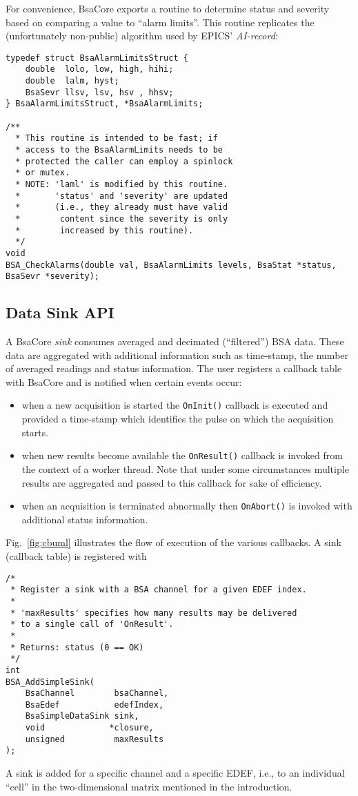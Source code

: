 \documentclass[11pt]{article}
\newcommand{\bsac}{BsaCore}
\newcommand{\bsa} {BSA}
\newcommand{\EDEF}{EDEF}
\newcommand{\cod}[1]{{\tt#1}}
\begin{document}
For convenience, \bsac{} exports a routine to determine status and severity based
on comparing a value to ``alarm limits''. This routine replicates the (unfortunately
non-public) algorithm used by EPICS' {\em AI-record}:
\begin{lstlisting}
typedef struct BsaAlarmLimitsStruct {
	double  lolo, low, high, hihi;
	double  lalm, hyst;
	BsaSevr llsv, lsv, hsv , hhsv;
} BsaAlarmLimitsStruct, *BsaAlarmLimits;

/**
  * This routine is intended to be fast; if
  * access to the BsaAlarmLimits needs to be
  * protected the caller can employ a spinlock
  * or mutex.
  * NOTE: 'laml' is modified by this routine.
  *       'status' and 'severity' are updated
  *       (i.e., they already must have valid
  *        content since the severity is only
  *        increased by this routine).
  */
void
BSA_CheckAlarms(double val, BsaAlarmLimits levels, BsaStat *status, BsaSevr *severity);
\end{lstlisting}

\subsection{Data Sink API}
A \bsac{} {\em sink} consumes averaged and decimated (``filtered'') \bsa{} data.
These data are aggregated with additional information such as time-stamp, the number
of averaged readings and status information.
The user registers a callback table with \bsac{} and is notified when certain
events occur:
\begin{itemize}
\item when a new acquisition is started the \cod{OnInit()} callback is executed
      and provided a time-stamp which identifies the pulse on which the acquisition
      starts.
\item when new results become available the \cod{OnResult()} callback is invoked
      from the context of a worker thread. Note that under some circumstances
      multiple results are aggregated and passed to this callback for sake of
      efficiency.
\item when an acquisition is terminated abnormally then \cod{OnAbort()} is invoked
      with additional status information.
\end{itemize}
Fig.~\ref{fig:cbuml} illustrates the flow of execution of the various callbacks.
A sink (callback table) is registered with
\begin{lstlisting}
/*
 * Register a sink with a BSA channel for a given EDEF index.
 *
 * 'maxResults' specifies how many results may be delivered
 * to a single call of 'OnResult'.
 *
 * Returns: status (0 == OK)
 */
int
BSA_AddSimpleSink(
    BsaChannel        bsaChannel,
    BsaEdef           edefIndex,
    BsaSimpleDataSink sink,
    void             *closure,
    unsigned          maxResults
);
\end{lstlisting}
A sink is added for a specific channel and a specific \EDEF{}, i.e.,
to an individual ``cell'' in the two-dimensional matrix mentioned in the introduction.
\end{document}
